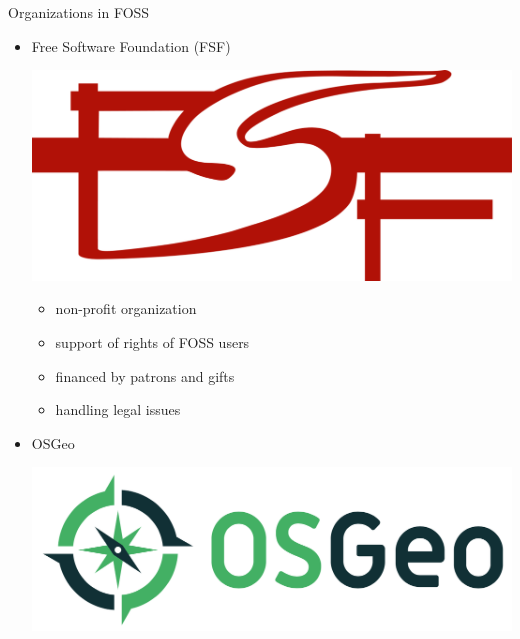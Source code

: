 \documentclass{beamer}
\begin{document}
        \begin{frame}[allowframebreaks]{Organizations in FOSS}
            \begin{itemize}
                \item Free Software Foundation (FSF) \hfill
                    \begin{minipage}[t]{0.35\textwidth}
                        \includegraphics[scale=0.03]{figs/fsf.png}
                    \end{minipage}
                    \begin{itemize}
                        \item non-profit organization 
                        \item support of rights of FOSS users
                        \item financed by patrons and gifts
                        \item handling legal issues
                    \end{itemize}

               
                
                \item OSGeo \hfill %
                    \begin{minipage}[t]{0.2\textwidth}
                        \includegraphics[scale=0.07]{figs/osgeo-logo.png}
                    \end{minipage}


\end{itemize}
\end{frame}
\end{document}
